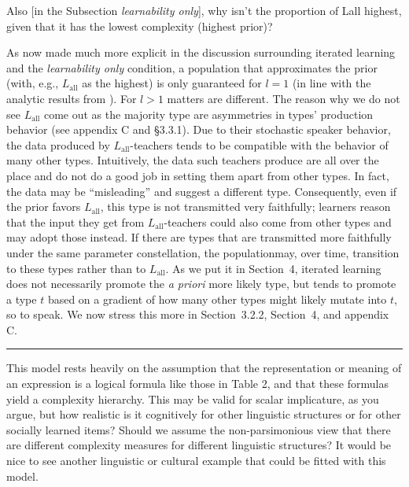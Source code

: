 \documentclass[12pt,a4paper]{article}
\begin{document}
\vspace{.5cm}
\begin{mdframed}[backgroundcolor=gray!25,linecolor=gray!25]
Also [in the Subsection {\em learnability only}], why isn't the proportion of Lall highest, given that it has the lowest complexity (highest prior)?
\end{mdframed}
%
As now made much more explicit in the discussion surrounding iterated learning and the {\em learnability only} condition, a population that approximates the prior (with, e.g., $L_{\text{all}}$ as the highest) is only guaranteed for $l = 1$ (in line with the analytic results from \citealt{griffiths+kalish:2007}). For $l > 1$ matters are different. The reason why we do not see $L_{\text{all}}$ come out as the majority type are asymmetries in types' production behavior (see appendix C and \S3.3.1). Due to their stochastic speaker behavior, the data produced by $L_{\text{all}}$-teachers tends to be compatible with the behavior of many other types. Intuitively, the data such teachers produce are all over the place and do not do a good job in setting them apart from other types. In fact, the data may be ``misleading'' and suggest a different type. Consequently, even if the prior favors $L_{\text{all}}$, this type is not transmitted very faithfully; learners reason that the input they get from $L_{\text{all}}$-teachers could also come from other types and may adopt those instead. If there are types that are transmitted more faithfully under the same parameter constellation, the populationmay, over time, transition to these types rather than to $L_{\text{all}}$. As we put it in Section~4, iterated learning does not necessarily promote the {\em a priori} more likely type, but tends to promote a type $t$ based on a gradient of how many other types might likely mutate into $t$, so to speak. We now stress this more in Section~3.2.2, Section~4, and appendix C.

\vspace{1cm}
\noindent\rule{\textwidth}{1pt}

\begin{mdframed}[backgroundcolor=gray!25,linecolor=gray!25,frametitle= Reviewer \thereviewerCounter~comment \thereviewerCommentCounter \hfill ~~({\it LOT \& model relation})]
%
This model rests heavily on the assumption that the representation or meaning of an expression is a logical formula like those in Table 2, and that these formulas yield a complexity hierarchy.  This may be valid for scalar implicature, as you argue, but how realistic is it cognitively for other linguistic structures or for other socially learned items? Should we assume the non-parsimonious view that there are different complexity measures for different linguistic structures? It would be nice to see another linguistic or cultural example that could be fitted with this model.
%
\end{mdframed}
\end{document}
